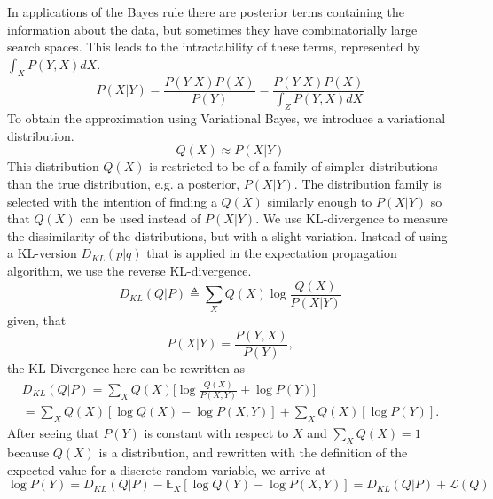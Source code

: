 In applications of the Bayes rule there are posterior terms containing the information about the data, but sometimes they have combinatorially large search spaces. This leads to the intractability of these terms, represented by $\int_X P(Y,X)dX$.
\begin{equation}%
	P(X|Y) = \frac{P(Y|X)P(X)}{P(Y)} = \frac{P(Y|X)P(X)}{\int_Z P(Y,X)dX}
	\label{eq:Bayes_with_intractable_term}
\end{equation}
To obtain the approximation using Variational Bayes, we introduce a variational distribution. 
\begin{equation}%
	Q(X) \approx P(X|Y)
	\label{eq: Variational Distribution}
\end{equation}
This distribution $Q(X)$ is restricted to be of a family of simpler distributions than the true distribution, e.g. a posterior, $P(X|Y)$. The distribution family is selected with the intention of finding a $Q(X)$ similarly enough to $P(X|Y)$ so that $Q(X)$ can be used instead of $P(X|Y)$. We use KL-divergence to measure the dissimilarity of the distributions, but with a slight variation. Instead of using a KL-version $D_{KL}(p|q)$ that is applied in the expectation propagation algorithm, we use the reverse KL-divergence. 
\begin{equation}%
	D_{KL}(Q|P) \triangleq \sum_{X} Q(X) \log \frac{Q(X)}{P(X|Y)}
	\label{eq: Expectation maximisation KL-Divergence}
\end{equation}
given, that
\begin{equation}%
	P(X|Y) = \frac{P(Y,X)}{P(Y)},
	\label{eq: ELBO Intro}
\end{equation}
the KL Divergence here can be rewritten as
\begin{subequations}%
	\label{eq:new_KL_ELBO}
	\begin{align}
		D_{KL}(Q|P) = \sum_{X}Q(X) \Big[\log \frac{Q(X)}{P(X,Y)}+\log P(Y)\Big]  \\
		= \sum_{X}Q(X) [\log Q(X) - \log P(X,Y)] + \sum_{X}Q(X)[\log P(Y)]. 
	\end{align}
\end{subequations}
After seeing that $P(Y)$ is constant with respect to $X$ and $\sum_{X}Q(X)=1$ because $Q(X)$ is a distribution, and rewritten with the definition of the expected value for a discrete random variable, we arrive at
\begin{equation}%
	\log P(Y) = D_{KL}(Q|P) - \mathbb{E}_X[\log Q(Y) - \log P(X,Y)] = D_{KL}(Q|P) + \mathcal{L}(Q)
	\label{eq:evidence_log}
\end{equation} 
